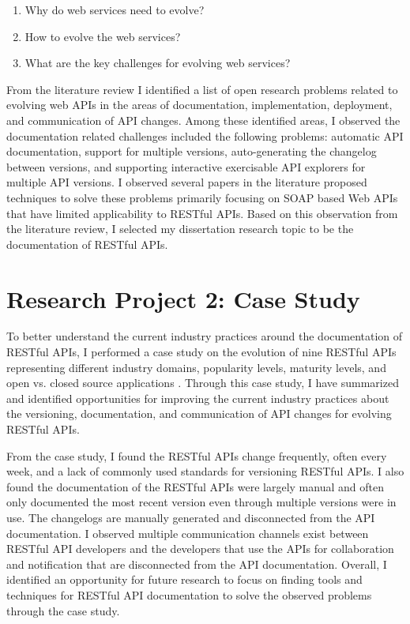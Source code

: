 \documentclass[11pt,oneside]{book}
\begin{document}
\begin{enumerate}
  \item Why do web services need to evolve?
  \item How to evolve the web services?
  \item What are the key challenges for evolving web services?
\end{enumerate}

From the literature review I identified a list of open research problems related to evolving web APIs in the areas of documentation, implementation, deployment, and communication of API changes. Among these identified areas, I observed the documentation related challenges included the following problems: automatic API documentation, support for multiple versions, auto-generating the changelog between versions, and supporting interactive exercisable API explorers for multiple API versions. I observed several papers in the literature proposed techniques to solve these problems primarily focusing on SOAP based Web APIs that have limited applicability to RESTful APIs. Based on this observation from the literature review, I selected my dissertation research topic to be the documentation of RESTful APIs.

\section{Research Project 2: Case Study}

To better understand the current industry practices around the documentation of RESTful APIs, I performed a case study on the evolution of nine RESTful APIs representing different industry domains, popularity levels, maturity levels, and open vs. closed source applications \cite{sohan2015case}. Through this case study, I have summarized and identified opportunities for improving the current industry practices about the versioning, documentation, and communication of API changes for evolving RESTful APIs.

From the case study, I found the RESTful APIs change frequently, often every week, and a lack of commonly used standards for versioning RESTful APIs. I also found the documentation of the RESTful APIs were largely manual and often only documented the most recent version even through multiple versions were in use. The changelogs are manually generated and disconnected from the API documentation. I observed multiple communication channels exist between RESTful API developers and the developers that use the APIs for collaboration and notification that are disconnected from the API documentation. Overall, I identified an opportunity for future research to focus on finding tools and techniques for RESTful API documentation to solve the observed problems through the case study.
\end{document}
